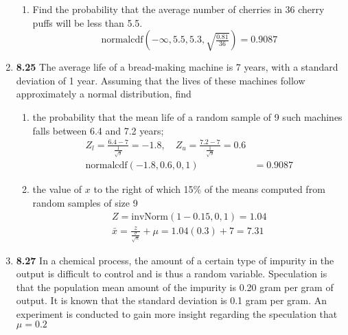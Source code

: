 \documentclass[basic, header]{nosvagor-notes}
\begin{document}
\begin{enumerate}[itemsep=2em]
\begin{enumerate}
      \item Find the probability that the average number of cherries in 36
        cherry puffs will be less than 5.5.
        \[%
          \text{normalcdf}(-\infty, 5.5, 5.3, \sqrt{\tfrac{0.81}{36}}) = \boxed{0.9087}
        \]%

    \end{enumerate}

  \item \textbf{8.25} The average life of a bread-making machine is 7 years,
    with a standard deviation of 1 year. Assuming that the lives of these
    machines follow approximately a normal distribution, find
    \begin{enumerate}

      \item the probability that the mean life of a random sample of 9 such
        machines falls between 6.4 and 7.2 years;
          \begin{align*}
            Z_l = \frac{6.4 - 7 }{\frac{1}{\sqrt{9}}} = -1.8, \quad
            Z_u = \frac{7.2 - 7 }{\frac{1}{\sqrt{9}}} = 0.6\\
            \text{normalcdf}(-1.8, 0.6, 0, 1) &= \boxed{0.9087}
          \end{align*}

      \item the value of \(x\) to the right of which 15\% of the means computed
        from random samples of size 9
        \begin{align*}
          Z = \text{invNorm}(1-0.15, 0, 1) = 1.04 \\
         \bar{x} = \frac{z}{\frac{\sigma}{\sqrt{n}}} + \mu = 1.04(0.3) + 7 = \boxed{7.31}
        \end{align*}

    \end{enumerate}

  \newpage %

    \item \textbf{8.27} In a chemical process, the amount of a certain type of
      impurity in the output is difficult to control and is thus a random
      variable. Speculation is that the population mean amount of the impurity
      is 0.20 gram per gram of output. It is known that the standard deviation
      is 0.1 gram per gram. An experiment is conducted to gain more insight
      regarding the speculation that \(\mu = 0.2\)


\end{enumerate}
\end{document}
